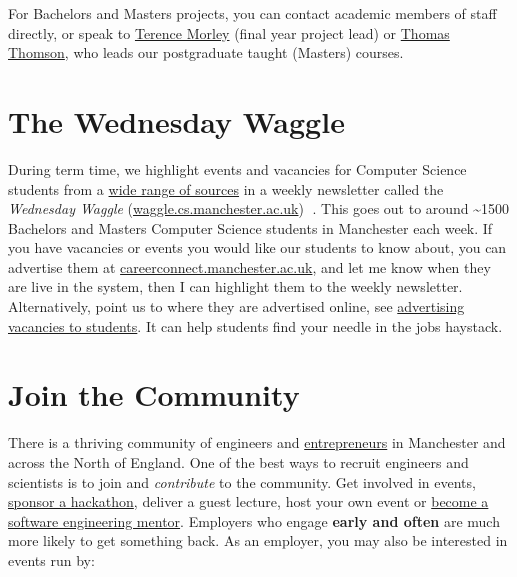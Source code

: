 \documentclass[
  12pt,
]{book}
\begin{document}
For Bachelors and Masters projects, you can contact academic members of staff directly, or speak to \href{https://research.manchester.ac.uk/en/persons/terence.morley}{Terence Morley} (final year project lead) or \href{https://research.manchester.ac.uk/en/persons/thomas.thomson}{Thomas Thomson}, who leads our postgraduate taught (Masters) courses.

\hypertarget{the-wednesday-waggle}{%
\section{The Wednesday Waggle}\label{the-wednesday-waggle}}

During term time, we highlight events and vacancies for Computer Science students from a \href{https://www.cdyf.me/finding}{wide range of sources} in a weekly newsletter called the \emph{Wednesday Waggle} (\href{https://waggle.cs.manchester.ac.uk/waggle/about}{waggle.cs.manchester.ac.uk}) 🐝. This goes out to around \textasciitilde1500 Bachelors and Masters Computer Science students in Manchester each week. If you have vacancies or events you would like our students to know about, you can advertise them at \href{https://careerconnect.manchester.ac.uk/}{careerconnect.manchester.ac.uk}, and let me know when they are live in the system, then I can highlight them to the weekly newsletter. Alternatively, point us to where they are advertised online, see \href{https://www.cdyf.me/finding\#studentjobs}{advertising vacancies to students}. It can help students find your needle in the jobs haystack.

\hypertarget{join-the-community}{%
\section{Join the Community}\label{join-the-community}}

There is a thriving community of engineers and \href{https://www.accelerateme.co/}{entrepreneurs} in Manchester and across the North of England. One of the best ways to recruit engineers and scientists is to join and \emph{contribute} to the community. Get involved in events, \href{https://www.unicsmcr.com/}{sponsor a hackathon}, deliver a guest lecture, host your own event or \href{https://www.cs.manchester.ac.uk/connect/business-engagement/industrial-mentoring/}{become a software engineering mentor}. Employers who engage \textbf{early and often} are much more likely to get something back. As an employer, you may also be interested in events run by:
\end{document}
